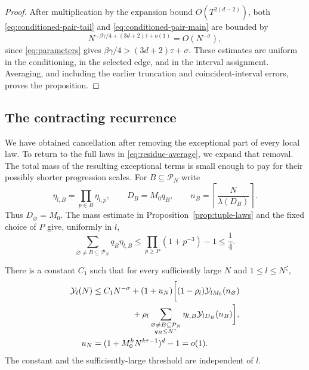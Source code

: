 \begin{proof}
After multiplication by the expansion bound $O(T^{2(d-2)})$, both
\eqref{eq:conditioned-pair-tail} and \eqref{eq:conditioned-pair-main}
are bounded by
\[
 N^{-\beta\gamma/4+(3d+2)\tau+o(1)}=O(N^{-\sigma}),
\]
since \eqref{eq:parameters} gives
$\beta\gamma/4>(3d+2)\tau+\sigma$.
These estimates are uniform in the conditioning, in the selected edge,
and in the interval assignment.  Averaging, and including the earlier
truncation and coincident-interval errors, proves the proposition.
\end{proof}

\subsection{The contracting recurrence}

We have obtained cancellation after removing the exceptional part of
every local law.  To return to the full laws in
\eqref{eq:residue-average}, we expand that removal.  The total mass of
the resulting exceptional terms is small enough to pay for their
possibly shorter progression scales.
For $B\subseteq\mathcal P_N$ write
\[
 \eta_{l,B}=\prod_{p\in B}\eta_{l,p},\qquad
 D_B=M_0q_B,\qquad
 n_B=\left\lceil\frac{N}{\lambda(D_B)}\right\rceil.
\]
Thus $D_\varnothing=M_0$.
The mass estimate in Proposition~\ref{prop:tuple-laws} and the fixed
choice of $P$ give, uniformly in $l$,
\begin{equation}\label{eq:exceptional-budget}
 \sum_{\varnothing\ne B\subseteq\mathcal P_N}q_B\eta_{l,B}
 \le\prod_{p\ge P}(1+p^{-3})-1\le\frac14.
\end{equation}

\begin{proposition}[Recurrence]\label{prop:descent-recurrence}
There is a constant $C_1$ such that for every sufficiently large $N$ and
$1\le l\le N^\zeta$,
\begin{equation}\label{eq:descent-recurrence}
 \begin{split}
 \mathcal Y_l(N)\le {}&C_1N^{-\sigma}+(1+u_N)\biggl[
 (1-\rho_l)\mathcal Y_{lM_0}(n_\varnothing)\\
 &\hspace{12mm}+\rho_l
 \sum_{\substack{\varnothing\ne B\subseteq\mathcal P_N\\q_B\le N^\tau}}
       \eta_{l,B}\mathcal Y_{lD_B}(n_B)\biggr],\\
 u_N={}&(1+M_0^kN^{k\tau-1})^d-1=o(1).
 \end{split}
\end{equation}
The constant and the sufficiently-large threshold are independent of $l$.
\end{proposition}

